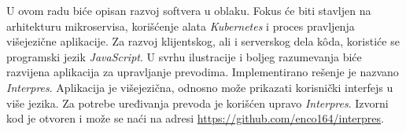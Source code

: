 U ovom radu biće opisan razvoj softvera u oblaku. Fokus će biti stavljen na 
arhitekturu mikroservisa, korišćenje alata \textit{Kubernetes} i proces pravljenja 
višejezične aplikacije. Za razvoj klijentskog, ali i serverskog dela 
kôda, koristiće se programski jezik \textit{JavaScript}. U svrhu ilustracije i
boljeg razumevanja biće razvijena aplikacija za upravljanje prevodima. 
Implementirano rešenje je nazvano \textit{Interpres}. Aplikacija je 
višejezična, odnosno može prikazati korisnički interfejs u više 
jezika. Za potrebe uređivanja prevoda je korišćen upravo \textit{Interpres}.
Izvorni kod je otvoren i može se naći na adresi \url{https://github.com/enco164/interpres}.




